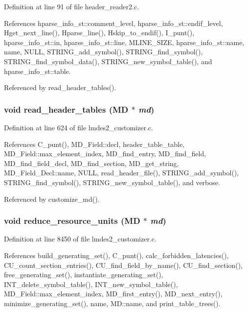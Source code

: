 Definition at line 91 of file header\_\-reader2.c.

References hparse\_\-info\_\-st::comment\_\-level, hparse\_\-info\_\-st::endif\_\-level, Hget\_\-next\_\-line(), Hparse\_\-line(), Hskip\_\-to\_\-endif(), I\_\-punt(), hparse\_\-info\_\-st::in, hparse\_\-info\_\-st::line, MLINE\_\-SIZE, hparse\_\-info\_\-st::name, name, NULL, STRING\_\-add\_\-symbol(), STRING\_\-find\_\-symbol(), STRING\_\-find\_\-symbol\_\-data(), STRING\_\-new\_\-symbol\_\-table(), and hparse\_\-info\_\-st::table.

Referenced by read\_\-header\_\-tables().
\subsubsection{\setlength{\rightskip}{0pt plus 5cm}void read\_\-header\_\-tables (\bf{MD} $\ast$ {\em md})}\label{lmdes2__customizer_8c_335c1116a90b866de4a2951d0bb9eca0}




Definition at line 624 of file lmdes2\_\-customizer.c.

References C\_\-punt(), MD\_\-Field::decl, header\_\-table\_\-table, MD\_\-Field::max\_\-element\_\-index, MD\_\-find\_\-entry, MD\_\-find\_\-field, MD\_\-find\_\-field\_\-decl, MD\_\-find\_\-section, MD\_\-get\_\-string, MD\_\-Field\_\-Decl::name, NULL, read\_\-header\_\-file(), STRING\_\-add\_\-symbol(), STRING\_\-find\_\-symbol(), STRING\_\-new\_\-symbol\_\-table(), and verbose.

Referenced by customize\_\-md().
\subsubsection{\setlength{\rightskip}{0pt plus 5cm}void reduce\_\-resource\_\-units (\bf{MD} $\ast$ {\em md})}\label{lmdes2__customizer_8c_80bbeee5328a5227004302dbc729efa9}




Definition at line 8450 of file lmdes2\_\-customizer.c.

References build\_\-generating\_\-set(), C\_\-punt(), calc\_\-forbidden\_\-latencies(), CU\_\-count\_\-section\_\-entries(), CU\_\-find\_\-field\_\-by\_\-name(), CU\_\-find\_\-section(), free\_\-generating\_\-set(), instantiate\_\-generating\_\-set(), INT\_\-delete\_\-symbol\_\-table(), INT\_\-new\_\-symbol\_\-table(), MD\_\-Field::max\_\-element\_\-index, MD\_\-first\_\-entry(), MD\_\-next\_\-entry(), minimize\_\-generating\_\-set(), name, MD::name, and print\_\-table\_\-trees().

